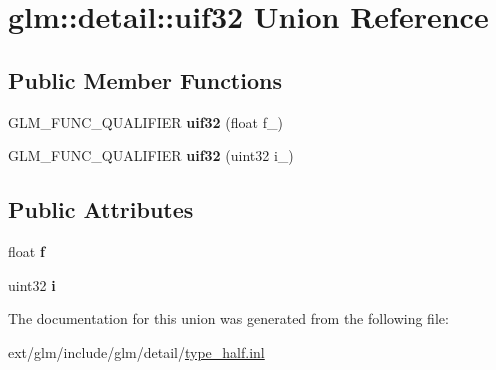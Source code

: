 \hypertarget{unionglm_1_1detail_1_1uif32}{\section{glm\-:\-:detail\-:\-:uif32 Union Reference}
\label{unionglm_1_1detail_1_1uif32}
}
\subsection*{Public Member Functions}
\begin{DoxyCompactItemize}
\item 
\hypertarget{unionglm_1_1detail_1_1uif32_a0d6e08c93b3d52c01e45864ff689c426}{G\-L\-M\-\_\-\-F\-U\-N\-C\-\_\-\-Q\-U\-A\-L\-I\-F\-I\-E\-R {\bfseries uif32} (float f\-\_\-)}\label{unionglm_1_1detail_1_1uif32_a0d6e08c93b3d52c01e45864ff689c426}

\item 
\hypertarget{unionglm_1_1detail_1_1uif32_aee424b46f48baa812572c015ec8bf434}{G\-L\-M\-\_\-\-F\-U\-N\-C\-\_\-\-Q\-U\-A\-L\-I\-F\-I\-E\-R {\bfseries uif32} (uint32 i\-\_\-)}\label{unionglm_1_1detail_1_1uif32_aee424b46f48baa812572c015ec8bf434}

\end{DoxyCompactItemize}
\subsection*{Public Attributes}
\begin{DoxyCompactItemize}
\item 
\hypertarget{unionglm_1_1detail_1_1uif32_a5f697f84c5a8ec72c2f3a4f705f5bde8}{float {\bfseries f}}\label{unionglm_1_1detail_1_1uif32_a5f697f84c5a8ec72c2f3a4f705f5bde8}

\item 
\hypertarget{unionglm_1_1detail_1_1uif32_a981c1c59e160db23c73908cd7e629229}{uint32 {\bfseries i}}\label{unionglm_1_1detail_1_1uif32_a981c1c59e160db23c73908cd7e629229}

\end{DoxyCompactItemize}


The documentation for this union was generated from the following file\-:\begin{DoxyCompactItemize}
\item 
ext/glm/include/glm/detail/\hyperlink{type__half_8inl}{type\-\_\-half.\-inl}\end{DoxyCompactItemize}
